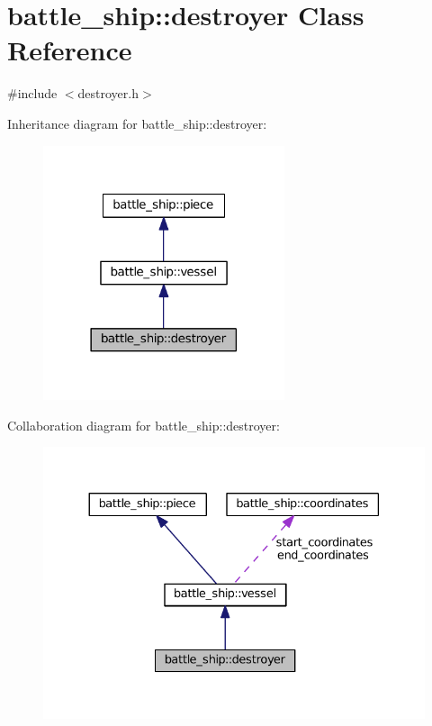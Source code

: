 \hypertarget{classbattle__ship_1_1destroyer}{}\section{battle\+\_\+ship\+:\+:destroyer Class Reference}
\label{classbattle__ship_1_1destroyer}


{\ttfamily \#include $<$destroyer.\+h$>$}



Inheritance diagram for battle\+\_\+ship\+:\+:destroyer\+:
\nopagebreak
\begin{figure}[H]
\begin{center}
\leavevmode
\includegraphics[width=201pt]{classbattle__ship_1_1destroyer__inherit__graph}
\end{center}
\end{figure}


Collaboration diagram for battle\+\_\+ship\+:\+:destroyer\+:
\nopagebreak
\begin{figure}[H]
\begin{center}
\leavevmode
\includegraphics[width=330pt]{classbattle__ship_1_1destroyer__coll__graph}
\end{center}
\end{figure}
